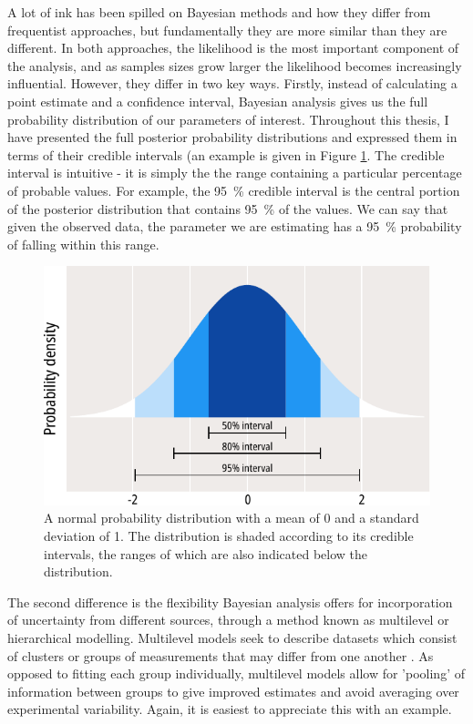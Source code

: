 A lot of ink has been spilled on Bayesian methods and how they differ from frequentist approaches, but fundamentally they are more similar than they are different.
In both approaches, the likelihood is the most important component of the analysis, and as samples sizes grow larger the likelihood becomes increasingly influential.
However, they differ in two key ways.
Firstly, instead of calculating a point estimate and a confidence interval, Bayesian analysis gives us the full probability distribution of our parameters of interest.
Throughout this thesis, I have presented the full posterior probability distributions and expressed them in terms of their credible intervals (an example is given in Figure \ref{ch2fig:intervals}.
The credible interval is intuitive - it is simply the the range containing a particular percentage of probable values.
For example, the \SI{95}{\percent} credible interval is the central portion of the posterior distribution that contains \SI{95}{\percent} of the values.
We can say that given the observed data, the parameter we are estimating has a \SI{95}{\percent} probability of falling within this range.

\begin{figure}
	\centering
	\includegraphics[width=.75\textwidth]{intervals.pdf}
	\caption[Credible intervals of a probability distribution]{
		{\bf{}}
		A normal probability distribution with a mean of 0 and a standard deviation of 1.
		The distribution is shaded according to its credible intervals, the ranges of which are also indicated below the distribution.
	}\label{ch2fig:intervals}
\end{figure}

The second difference is the flexibility Bayesian analysis offers for incorporation of uncertainty from different sources, through a method known as multilevel or hierarchical modelling.
Multilevel models seek to describe datasets which consist of clusters or groups of measurements that may differ from one another \cite{gelman_bayesian_2014, mcelreath_statistical_2020}.
As opposed to fitting each group individually, multilevel models allow for 'pooling' of information between groups to give improved estimates and avoid averaging over experimental variability.
Again, it is easiest to appreciate this with an example.

